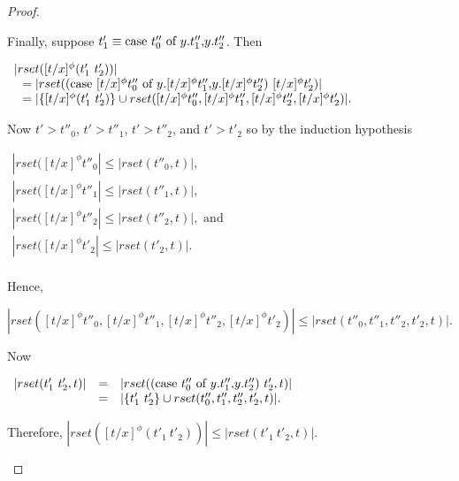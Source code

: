 \begin{proof}
\begin{itemize}
  Finally, suppose $t'_1 \equiv \mbox{case}\ t''_0\ \text{of}\ y\text{.}t''_1\text{,}y\text{.}t''_2$.  Then
  \begin{center}
    \begin{math}
      \begin{array}{lll}
        |rset([t/x]^\phi (t'_1\ t'_2))| \\
        \,\,\,\,= |rset((\mbox{case}\ [t/x]^\phi t''_0\ \text{of}\ y\text{.}[t/x]^\phi t''_1\text{,}y\text{.}[t/x]^\phi t''_2)\ [t/x]^\phi t'_2)|\\
        \,\,\,\,= |\{[t/x]^\phi (t'_1\ t'_2)\} \cup rset([t/x]^\phi t''_0,[t/x]^\phi t''_1,[t/x]^\phi t''_2,[t/x]^\phi t'_2)|.
      \end{array}
    \end{math}
  \end{center}
  Now $t' > t''_0$, $t' > t''_1$, $t' > t''_2$, and $t' > t'_2$ so by the induction hypothesis
  \begin{center}
    \begin{math}
      \begin{array}{lll}
        |rset([t/x]^\phi t''_0| \leq |rset(t''_0, t)|,\\
        |rset([t/x]^\phi t''_1| \leq |rset(t''_1, t)|,\\
        |rset([t/x]^\phi t''_2| \leq |rset(t''_2, t)|, \text{ and }\\
        |rset([t/x]^\phi t'_2| \leq |rset(t'_2, t)|.\\
      \end{array}
    \end{math}
  \end{center}
  Hence, 
  \begin{center}
    \begin{math}
      |rset([t/x]^\phi t''_0,[t/x]^\phi t''_1,[t/x]^\phi t''_2,[t/x]^\phi t'_2)| \leq |rset(t''_0, t''_1, t''_2, t'_2, t)|.
    \end{math}
  \end{center}
  Now
  \begin{center}
    \begin{math}
      \begin{array}{lll}
        |rset(t'_1\ t'_2,t)| & = & |rset((\mbox{case}\ t''_0\ \text{of}\ y\text{.}t''_1\text{,}y\text{.}t''_2)\ t'_2,t)|\\
        & = & |\{t'_1\ t'_2\} \cup rset(t''_0, t''_1, t''_2, t'_2, t)|.
      \end{array}
    \end{math}
  \end{center}
  Therefore, $|rset([t/x]^\phi (t'_1\ t'_2))| \leq |rset(t'_1\ t'_2,t)|$.
  

\end{itemize}
\end{proof}
